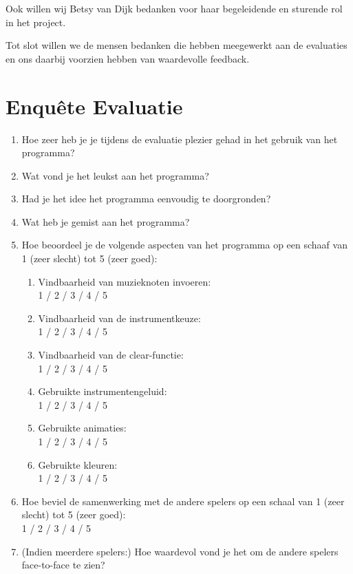 \documentclass{acm}
\begin{document}
Ook willen wij Betsy van Dijk bedanken voor haar begeleidende en sturende rol in het project.

Tot slot willen we de mensen bedanken die hebben meegewerkt aan de evaluaties en ons daarbij voorzien hebben van waardevolle feedback.




\vspace{10cm}

\appendix

\section{Enqu\^ete Evaluatie}
\label{sec_bijlage}
\begin{enumerate}
 \item Hoe zeer heb je je tijdens de evaluatie plezier gehad in het gebruik van het programma?
 \item Wat vond je het leukst aan het programma?
 \item Had je het idee het programma eenvoudig te doorgronden?
 \item Wat heb je gemist aan het programma?
 \item Hoe beoordeel je de volgende aspecten van het programma op een schaaf van 1 (zeer slecht) tot 5 (zeer goed):
 \begin{enumerate}
   \item Vindbaarheid van muzieknoten invoeren: \\ 1 / 2 / 3 / 4 / 5
   \item Vindbaarheid van de instrumentkeuze: \\ 1 / 2 / 3 / 4 / 5
   \item Vindbaarheid van de clear-functie: \\ 1 / 2 / 3 / 4 / 5
   \item Gebruikte instrumentengeluid: \\ 1 / 2 / 3 / 4 / 5
   \item Gebruikte animaties: \\ 1 / 2 / 3 / 4 / 5
   \item Gebruikte kleuren: \\ 1 / 2 / 3 / 4 / 5
\end{enumerate}
 \item Hoe beviel de samenwerking met de andere spelers op een schaal van 1 (zeer slecht) tot 5 (zeer goed):  \\ 1 / 2 / 3 / 4 / 5
 \item (Indien meerdere spelers:) Hoe waardevol vond je het om de andere spelers face-to-face te zien?


\end{enumerate}
\end{document}
